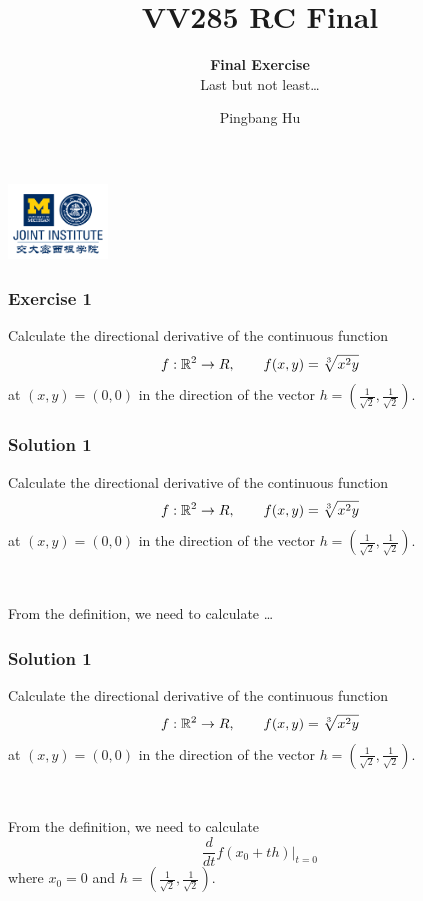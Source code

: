 \documentclass[10pt, t, allowdisplaybreaks]{beamer}
\title{VV285 RC Final}
\subtitle{\textbf{Final Exercise}\\\large Last but not least\dots}
\institute[UM-SJTU JI]{University of Michigan-Shanghai Jiao Tong University Joint Institute}
\author{Pingbang Hu}
\newcommand{\nullspacesmall}{~\vspace{1em}}
\newcommand{\at}[3]{\left.#1\right\vert_{#2}^{#3}}
\begin{document}
\begin{frame}
    \titlepage
    \begin{center}
        \includegraphics[height=2cm]{Figures/logo/logo2.png}
    \end{center}
\end{frame}

\begin{frame}
    \frametitle{Exercise 1}
    \par Calculate the directional derivative of the continuous function
    \begin{equation*}
        f:\mathbb{R}^2\rightarrow R, \qquad f(x,y) = \sqrt[3]{x^2y}
    \end{equation*}
    at $(x,y) = (0,0)$ in the direction of the vector $h = (\frac{1}{\sqrt{2}}, \frac{1}{\sqrt{2}})$.
\end{frame}


\begin{frame}
    \frametitle{Solution 1}
    \par Calculate the directional derivative of the continuous function
    \begin{equation*}
        f:\mathbb{R}^2\rightarrow R, \qquad f(x,y) = \sqrt[3]{x^2y}
    \end{equation*}
    at $(x,y) = (0,0)$ in the direction of the vector $h = (\frac{1}{\sqrt{2}}, \frac{1}{\sqrt{2}})$.

    \nullspacesmall

    \par From the definition, we need to calculate \dots
\end{frame}

\begin{frame}
    \frametitle{Solution 1}
    \par Calculate the directional derivative of the continuous function
    \begin{equation*}
        f:\mathbb{R}^2\rightarrow R, \qquad f(x,y) = \sqrt[3]{x^2y}
    \end{equation*}
    at $(x,y) = (0,0)$ in the direction of the vector $h = (\frac{1}{\sqrt{2}}, \frac{1}{\sqrt{2}})$.

    \nullspacesmall

    \par From the definition, we need to calculate
    \begin{equation*}
        \frac{d}{dt} \at{f(x_0 + th)}{t = 0}{}
    \end{equation*}
    where $x_0 = 0$ and $h = (\frac{1}{\sqrt{2}}, \frac{1}{\sqrt{2}})$.
\end{frame}
\end{document}
